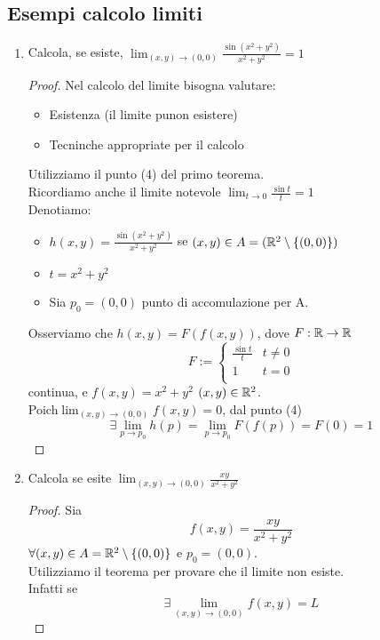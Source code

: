 \subsection{Esempi calcolo limiti}
\begin{exercise}
  \begin{enumerate}
    \item Calcola, se esiste, $\lim_{(x,y)\to (0,0)} \frac{\sin(x^2+y^2)}{x^2+y^2} = 1$
    \begin{proof}
      Nel calcolo del limite bisogna valutare:
      \begin{itemize}
        \item Esistenza (il limite pu\aco non esistere)
        \item Tecninche appropriate per il calcolo
      \end{itemize}
      Utilizziamo il punto (4) del primo teorema. 
      \\Ricordiamo anche il limite notevole $\lim_{t\to 0} \frac{\sin{t}}{t} = 1$\\
      Denotiamo:
      \begin{itemize}
        \item $h(x,y) = \frac{\sin(x^2+y^2)}{x^2+y^2}$ se $(x,y) \in A = (\mathbb{R}^2 \setminus \{(0,0)\})$
        \item $t = x^2 + y^2$
        \item Sia $p_0 = (0,0)$ punto di accomulazione per A.
      \end{itemize}
      Osserviamo che $h(x,y) = F(f(x,y))$, dove $F:\mathbb{R}\to\mathbb{R}$
      $$F:= \left\{ \begin{array}{cl}
        \frac{\sin{t}}{t} & t\not = 0 \\
        1 & t = 0 \\
      \end{array}\right.$$
      \ace continua, e $f(x,y) = x^2 + y^2$ $(x,y) \in \mathbb{R}^2$. \\
      Poich\ace $\lim_{(x,y)\to(0,0)} f(x,y) = 0$, dal punto (4)
       $$\exists \lim_{p \to p_0} h(p) = \lim_{p\to p_0} F(f(p)) = F(0) = 1$$
    \end{proof}
    \item Calcola se esite $\lim_{(x,y)\to (0,0)} \frac{xy}{x^2+y^2}$
    \begin{proof}
      Sia $$f(x,y) = \frac{xy}{x^2+y^2}$$ $\forall (x,y)\in A = \mathbb{R}^2\setminus \{(0,0)\}$ e $p_0 = (0,0)$.\\
      Utilizziamo il teorema per provare che il limite non esiste.\\
      Infatti se $$\exists \lim_{(x,y)\to (0,0)} f(x,y) = L$$

\end{proof}
\end{enumerate}
\end{exercise}
